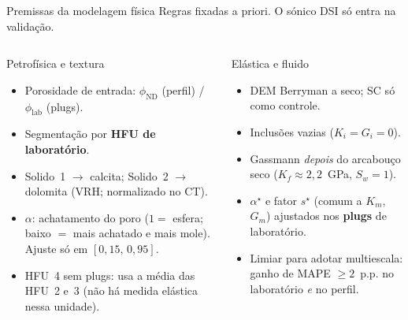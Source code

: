 \documentclass[aspectratio=169,10pt]{beamer}
\newcommand{\philab}{\ensuremath{\phi_{\mathrm{lab}}}}
\newcommand{\phiND}{\ensuremath{\phi_{\mathrm{ND}}}}
\begin{document}
\begin{frame}{Premissas da modelagem física}
  \footnotesize
  Regras fixadas a priori. O sónico DSI só entra na validação.
  \vspace{0.06cm}
  \begin{columns}[T,onlytextwidth]
    \begin{block}{Petrofísica e textura}
      \scriptsize
      \begin{itemize}
        \item Porosidade de entrada: \phiND{} (perfil) / \philab{} (plugs).
        \item Segmentação por \textbf{HFU de laboratório}.
        \item Solido~1 $\rightarrow$ calcita; Solido~2 $\rightarrow$ dolomita
              (VRH; normalizado no CT).
        \item $\alpha$: achatamento do poro ($1=$ esfera; baixo $=$ mais
              achatado e mais mole). Ajuste só em $[0{,}15,\,0{,}95]$.
        \item HFU~4 sem plugs: usa a média das HFU~2 e~3
              (não há medida elástica nessa unidade).
      \end{itemize}
    \end{block}
    \begin{block}{Elástica e fluido}
      \scriptsize
      \begin{itemize}
        \item DEM Berryman a seco; SC só como controle.
        \item Inclusões vazias ($K_i = G_i = 0$).
        \item Gassmann \emph{depois} do arcabouço seco
              ($K_f \approx 2{,}2$~GPa, $S_w = 1$).
        \item $\alpha^\star$ e fator $s^\star$ (comum a $K_m$, $G_m$)
              ajustados nos \textbf{plugs} de laboratório.
        \item Limiar para adotar multiescala: ganho de MAPE $\geq 2$~p.p.
              no laboratório \emph{e} no perfil.
      \end{itemize}
    \end{block}
  \end{columns}
\end{frame}
\end{document}
